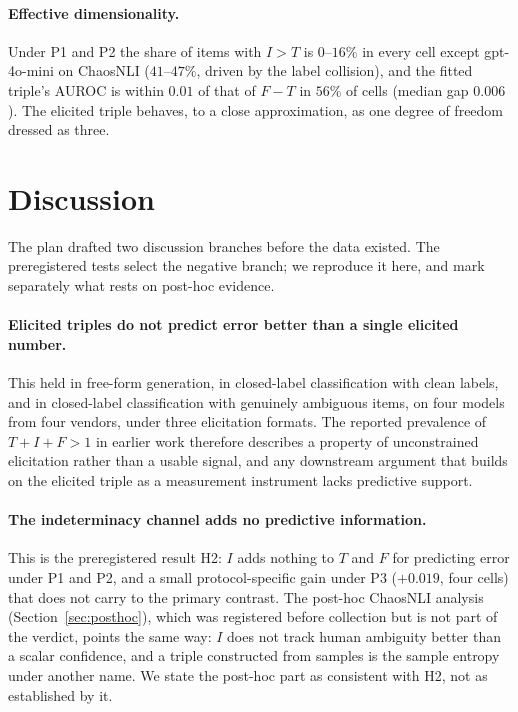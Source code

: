 \documentclass[11pt]{article}
\begin{document}
\paragraph{Effective dimensionality.} Under P1 and P2 the share of items with $I>T$ is
$0$--$16\%$ in every cell except gpt-4o-mini on ChaosNLI ($41$--$47\%$, driven by the label
collision), and the fitted triple's AUROC is within $0.01$ of that of $F-T$ in $56\%$ of cells
(median gap $0.006$). The elicited triple behaves, to a close approximation, as one degree of
freedom dressed as three.

\section{Discussion}
\label{sec:discussion}

The plan drafted two discussion branches before the data existed. The preregistered tests select
the negative branch; we reproduce it here, and mark separately what rests on post-hoc evidence.

\paragraph{Elicited triples do not predict error better than a single elicited number.} This
held in free-form generation, in closed-label classification with clean labels, and in
closed-label classification with genuinely ambiguous items, on four models from four vendors,
under three elicitation formats. The reported prevalence of $T+I+F>1$ in earlier work
\citep{leyva2026breaking,mason2026tensors} therefore describes a property of unconstrained
elicitation rather than a usable signal, and any downstream argument that builds on the elicited
triple as a measurement instrument lacks predictive support.

\paragraph{The indeterminacy channel adds no predictive information.} This is the preregistered
result H2: $I$ adds nothing to $T$ and $F$ for predicting error under P1 and P2, and a small
protocol-specific gain under P3 ($+0.019$, four cells) that does not carry to the primary contrast.
The post-hoc ChaosNLI analysis (Section~\ref{sec:posthoc}), which was registered before
collection but is not part of the verdict, points the same way: $I$ does not track human ambiguity
better than a scalar confidence, and a triple constructed from samples is the sample entropy under
another name. We state the post-hoc part as consistent with H2, not as established by it.
\end{document}

